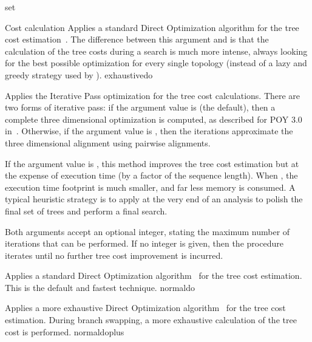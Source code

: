 \begin{command}{set}{}
\begin{arguments}
\begin{argumentgroup}{Cost calculation}
                {Applies a standard Direct Optimization algorithm for the tree
                cost estimation~\cite{wheeler1996,wheeler2002a}. The difference 
                between this argument and  is
                that the calculation of the tree costs during a search is much
                more intense, always looking for the best possible optimization 
                for every single topology (instead of a lazy and greedy strategy
                used by ).}
                {exhaustivedo}

                {Applies the Iterative Pass optimization for the tree cost
                calculations. There are two forms of iterative pass: if the
                argument value is  (the default), then a complete three
                dimensional optimization is computed, as described for POY 3.0 in~\cite{wheeler2003a}. 
                Otherwise, if the argument value is , then the iterations
                approximate the three dimensional alignment using pairwise
                alignments. 
               
                \indent If the argument value is , this method improves the tree
                cost estimation but at the expense of execution time (by a factor of the sequence length).
                 When , the execution time footprint is much
                smaller, and far less memory is consumed.  A typical heuristic
                strategy is to apply   at the very end of
                an analysis to polish the final set of trees and perform a final
                search.

                \indent Both arguments accept an optional integer, stating the maximum
                number of iterations that can be performed. If no integer is
                given, then the procedure iterates until no further tree cost
                improvement is incurred.}
                {}
                
                {Applies a standard Direct Optimization algorithm~\cite{Varon2013}
                for the tree cost estimation. This is the default and fastest technique.}
                {normaldo}

                {Applies a more exhaustive Direct Optimization algorithm~\cite{Varon2013} 
                for the tree cost estimation. During branch swapping, a more exhaustive 
                calculation of the tree cost is performed.}
                {normaldoplus}
                

\end{argumentgroup}
\end{arguments}
\end{command}
